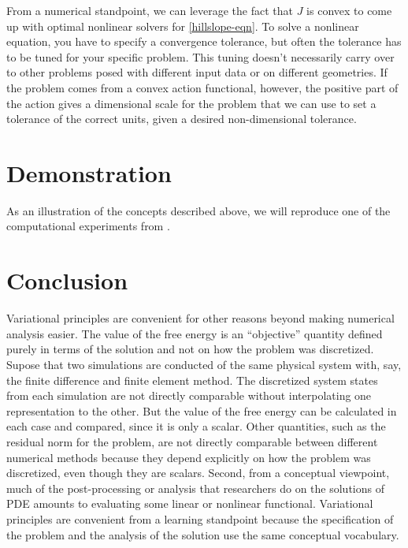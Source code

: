 \documentclass{article}
\theoremstyle{definition}
\theoremstyle{plain}
\begin{document}
From a numerical standpoint, we can leverage the fact that $J$ is convex to come up with optimal nonlinear solvers for \eqref{hillslope-eqn}.
To solve a nonlinear equation, you have to specify a convergence tolerance, but often the tolerance has to be tuned for your specific problem.
This tuning doesn't necessarily carry over to other problems posed with different input data or on different geometries.
If the problem comes from a convex action functional, however, the positive part of the action gives a dimensional scale for the problem that we can use to set a tolerance of the correct units, given a desired non-dimensional tolerance.

\section{Demonstration}

As an illustration of the concepts described above, we will reproduce one of the computational experiments from \citet{roering2008well}.

\section{Conclusion}

Variational principles are convenient for other reasons beyond making numerical analysis easier.
The value of the free energy is an ``objective'' quantity defined purely in terms of the solution and not on how the problem was discretized.
Supose that two simulations are conducted of the same physical system with, say, the finite difference and finite element method.
The discretized system states from each simulation are not directly comparable without interpolating one representation to the other.
But the value of the free energy can be calculated in each case and compared, since it is only a scalar.
Other quantities, such as the residual norm for the problem, are not directly comparable between different numerical methods because they depend explicitly on how the problem was discretized, even though they are scalars.
Second, from a conceptual viewpoint, much of the post-processing or analysis that researchers do on the solutions of PDE amounts to evaluating some linear or nonlinear functional.
Variational principles are convenient from a learning standpoint because the specification of the problem and the analysis of the solution use the same conceptual vocabulary.



\end{document}
